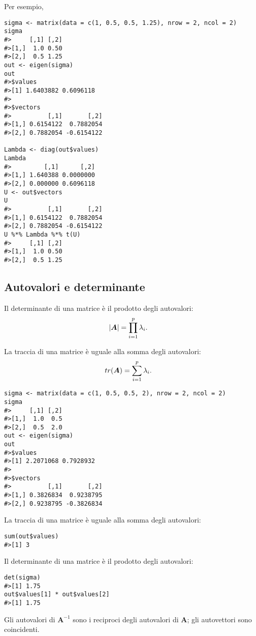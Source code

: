 Per esempio, 
\begin{lstlisting}
sigma <- matrix(data = c(1, 0.5, 0.5, 1.25), nrow = 2, ncol = 2)
sigma
#>     [,1] [,2]
#>[1,]  1.0 0.50
#>[2,]  0.5 1.25
out <- eigen(sigma)
out
#>$values
#>[1] 1.6403882 0.6096118
#>
#>$vectors
#>          [,1]       [,2]
#>[1,] 0.6154122  0.7882054
#>[2,] 0.7882054 -0.6154122

Lambda <- diag(out$values)
Lambda
#>         [,1]      [,2]
#>[1,] 1.640388 0.0000000
#>[2,] 0.000000 0.6096118
U <- out$vectors
U
#>          [,1]       [,2]
#>[1,] 0.6154122  0.7882054
#>[2,] 0.7882054 -0.6154122
U %*% Lambda %*% t(U)
#>     [,1] [,2]
#>[1,]  1.0 0.50
#>[2,]  0.5 1.25
\end{lstlisting}

\subsection{Autovalori e determinante}

 Il determinante di una matrice {\`e} il prodotto degli autovalori:
    \begin{align}
    |\boldsymbol{A}| &= \prod_{i=1}^{p} \lambda_i. \notag
    \end{align}

 La traccia di una matrice {\`e} uguale alla somma
degli autovalori:
   \begin{align}
    tr(\boldsymbol{A}) &= \sum_{i=1}^{p} \lambda_i. \notag
    \end{align}

\begin{lstlisting}
sigma <- matrix(data = c(1, 0.5, 0.5, 2), nrow = 2, ncol = 2)
sigma
#>     [,1] [,2]
#>[1,]  1.0  0.5
#>[2,]  0.5  2.0
out <- eigen(sigma)
out
#>$values
#>[1] 2.2071068 0.7928932
#>
#>$vectors
#>          [,1]       [,2]
#>[1,] 0.3826834  0.9238795
#>[2,] 0.9238795 -0.3826834
\end{lstlisting}

La traccia di una matrice è uguale alla somma degli autovalori:

\begin{lstlisting}
sum(out$values)
#>[1] 3
\end{lstlisting}
Il determinante di una matrice è il prodotto degli autovalori:
\begin{lstlisting}
det(sigma)
#>[1] 1.75
out$values[1] * out$values[2]
#>[1] 1.75
\end{lstlisting}

Gli autovalori di $\boldsymbol{A}^{-1}$ sono i reciproci
degli autovalori di $\boldsymbol{A}$; gli autovettori sono coincidenti.

